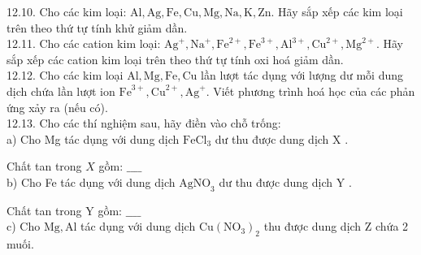 \documentclass[10pt]{article}
\begin{document}
12.10. Cho các kim loại: $\mathrm{Al}, \mathrm{Ag}, \mathrm{Fe}, \mathrm{Cu}, \mathrm{Mg}, \mathrm{Na}, \mathrm{K}, \mathrm{Zn}$. Hãy sắp xếp các kim loại trên theo thứ tự tính khử giảm dần.\\
12.11. Cho các cation kim loại: $\mathrm{Ag}^{+}, \mathrm{Na}^{+}, \mathrm{Fe}^{2+}, \mathrm{Fe}^{3+}, \mathrm{Al}^{3+}, \mathrm{Cu}^{2+}, \mathrm{Mg}^{2+}$. Hãy sắp xếp các cation kim loại trên theo thứ tự tính oxi hoá giảm dần.\\
12.12. Cho các kim loại $\mathrm{Al}, \mathrm{Mg}, \mathrm{Fe}, \mathrm{Cu}$ lần lượt tác dụng với lượng dư mỗi dung dịch chứa lần lượt ion $\mathrm{Fe}^{3+}, \mathrm{Cu}^{2+}, \mathrm{Ag}^{+}$. Viết phương trình hoá học của các phản ứng xảy ra (nếu có).\\
12.13. Cho các thí nghiệm sau, hãy điền vào chỗ trống:\\
a) Cho Mg tác dụng với dung dịch $\mathrm{FeCl}_{3}$ dư thu được dung dịch X .

Chất tan trong $X$ gồm: $\_\_\_\_$\\
b) Cho Fe tác dụng với dung dịch $\mathrm{AgNO}_{3}$ dư thu được dung dịch Y .

Chất tan trong Y gồm: $\_\_\_\_$\\
c) Cho $\mathrm{Mg}, \mathrm{Al}$ tác dụng với dung dịch $\mathrm{Cu}\left(\mathrm{NO}_{3}\right)_{2}$ thu được dung dịch Z chứa 2 muối.
\end{document}
